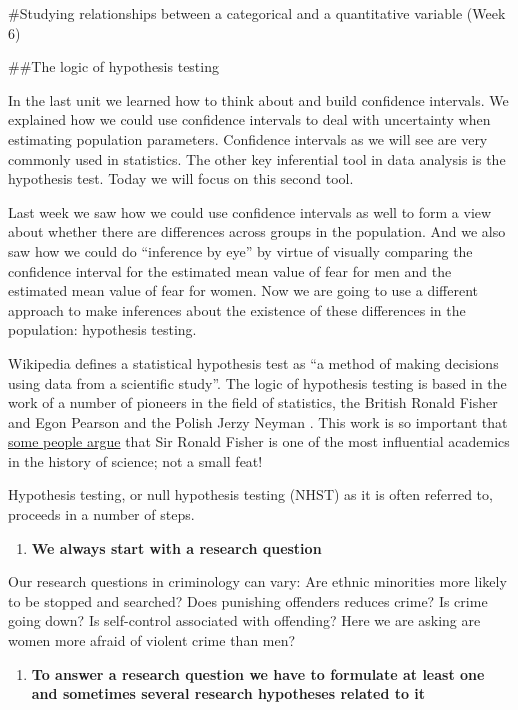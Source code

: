 \documentclass[]{book}
\providecommand{\tightlist}{%
  \setlength{\itemsep}{0pt}\setlength{\parskip}{0pt}}
\theoremstyle{definition}
\theoremstyle{definition}
\theoremstyle{definition}
\theoremstyle{remark}
\begin{document}
\#Studying relationships between a categorical and a quantitative
variable (Week 6)

\#\#The logic of hypothesis testing

In the last unit we learned how to think about and build confidence
intervals. We explained how we could use confidence intervals to deal
with uncertainty when estimating population parameters. Confidence
intervals as we will see are very commonly used in statistics. The other
key inferential tool in data analysis is the hypothesis test. Today we
will focus on this second tool.

Last week we saw how we could use confidence intervals as well to form a
view about whether there are differences across groups in the
population. And we also saw how we could do ``inference by eye'' by
virtue of visually comparing the confidence interval for the estimated
mean value of fear for men and the estimated mean value of fear for
women. Now we are going to use a different approach to make inferences
about the existence of these differences in the population: hypothesis
testing.

Wikipedia defines a statistical hypothesis test as ``a method of making
decisions using data from a scientific study''. The logic of hypothesis
testing is based in the work of a number of pioneers in the field of
statistics, the British Ronald Fisher and Egon Pearson and the Polish
Jerzy Neyman . This work is so important that
\href{http://simplystatistics.org/2012/03/07/r-a-fisher-is-the-most-influential-scientist-ever/}{some
people argue} that Sir Ronald Fisher is one of the most influential
academics in the history of science; not a small feat!

Hypothesis testing, or null hypothesis testing (NHST) as it is often
referred to, proceeds in a number of steps.

\begin{enumerate}
\def\labelenumi{\arabic{enumi}.}
\tightlist
\item
  \textbf{We always start with a research question}
\end{enumerate}

Our research questions in criminology can vary: Are ethnic minorities
more likely to be stopped and searched? Does punishing offenders reduces
crime? Is crime going down? Is self-control associated with offending?
Here we are asking are women more afraid of violent crime than men?

\begin{enumerate}
\def\labelenumi{\arabic{enumi}.}
\setcounter{enumi}{1}
\tightlist
\item
  \textbf{To answer a research question we have to formulate at least
  one and sometimes several research hypotheses related to it}
\end{enumerate}
\end{document}
